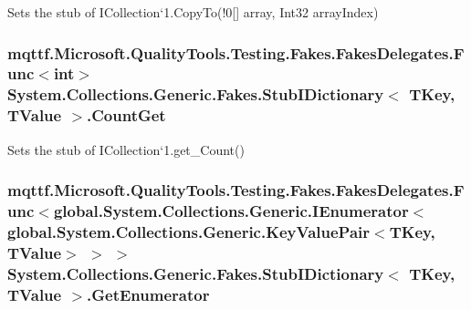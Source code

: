 Sets the stub of I\-Collection`1.Copy\-To(!0\mbox{[}\mbox{]} array, Int32 array\-Index)

\hypertarget{class_system_1_1_collections_1_1_generic_1_1_fakes_1_1_stub_i_dictionary_3_01_t_key_00_01_t_value_01_4_aa17f4c7cc3994b00dc7ee67fac73754b}{
\subsubsection[{Count\-Get}]{\setlength{\rightskip}{0pt plus 5cm}mqttf.\-Microsoft.\-Quality\-Tools.\-Testing.\-Fakes.\-Fakes\-Delegates.\-Func$<$int$>$ System.\-Collections.\-Generic.\-Fakes.\-Stub\-I\-Dictionary$<$ T\-Key, T\-Value $>$.Count\-Get}}\label{class_system_1_1_collections_1_1_generic_1_1_fakes_1_1_stub_i_dictionary_3_01_t_key_00_01_t_value_01_4_aa17f4c7cc3994b00dc7ee67fac73754b}


Sets the stub of I\-Collection`1.get\-\_\-\-Count()

\hypertarget{class_system_1_1_collections_1_1_generic_1_1_fakes_1_1_stub_i_dictionary_3_01_t_key_00_01_t_value_01_4_a13b79991b9dc339f20f79b3454b35356}{
\subsubsection[{Get\-Enumerator}]{\setlength{\rightskip}{0pt plus 5cm}mqttf.\-Microsoft.\-Quality\-Tools.\-Testing.\-Fakes.\-Fakes\-Delegates.\-Func$<$global.\-System.\-Collections.\-Generic.\-I\-Enumerator$<$global.\-System.\-Collections.\-Generic.\-Key\-Value\-Pair$<$T\-Key, T\-Value$>$ $>$ $>$ System.\-Collections.\-Generic.\-Fakes.\-Stub\-I\-Dictionary$<$ T\-Key, T\-Value $>$.Get\-Enumerator}}\label{class_system_1_1_collections_1_1_generic_1_1_fakes_1_1_stub_i_dictionary_3_01_t_key_00_01_t_value_01_4_a13b79991b9dc339f20f79b3454b35356}


